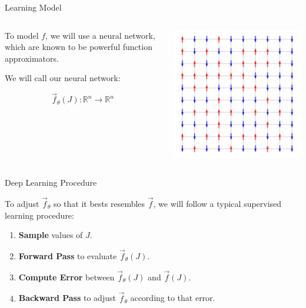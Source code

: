 \documentclass[aspectratio=169, 12pt]{beamer}
\begin{document}
\begin{frame}{Learning Model}


    \begin{columns}
        \begin{column}{.6\textwidth}
            
            To model $f$, we will use a neural network, which are known to be powerful function approximators. 

            We will call our neural network:

            \[
            \vec{f}_\theta(J) : \mathbb{R}^n \rightarrow \mathbb{R}^n
            \]
            
        \end{column}
        \begin{column}{.4\textwidth}
            \includegraphics[width=\textwidth]{images/ising-spins-grid.png}
        \end{column}
    \end{columns}
    
\end{frame}

\begin{frame}{Deep Learning Procedure}

    To adjust $\vec{f}_\theta$ so that it bests resembles $\vec{f}$, we will follow a typical supervised learning procedure:
    \begin{enumerate}
        \item \textbf{Sample} values of $J$. 
        \item \textbf{Forward Pass} to evaluate $\vec{f}_\theta(J)$. 
        \item \textbf{Compute Error} between $\vec{f}_\theta(J)$ and $\vec{f}(J)$. 
        \item \textbf{Backward Pass} to adjust $\vec{f}_\theta$ according to that error. 
    \end{enumerate}

\end{frame}
\end{document}
